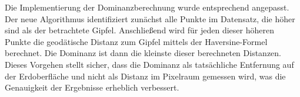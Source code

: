 Die Implementierung der Dominanzberechnung wurde entsprechend angepasst. Der neue Algorithmus identifiziert zunächst alle Punkte im Datensatz, die höher sind als der betrachtete Gipfel. Anschließend wird für jeden dieser höheren Punkte die geodätische Distanz zum Gipfel mittels der Haversine-Formel berechnet. Die Dominanz ist dann die kleinste dieser berechneten Distanzen. Dieses Vorgehen stellt sicher, dass die Dominanz als tatsächliche Entfernung auf der Erdoberfläche und nicht als Distanz im Pixelraum gemessen wird, was die Genauigkeit der Ergebnisse erheblich verbessert.